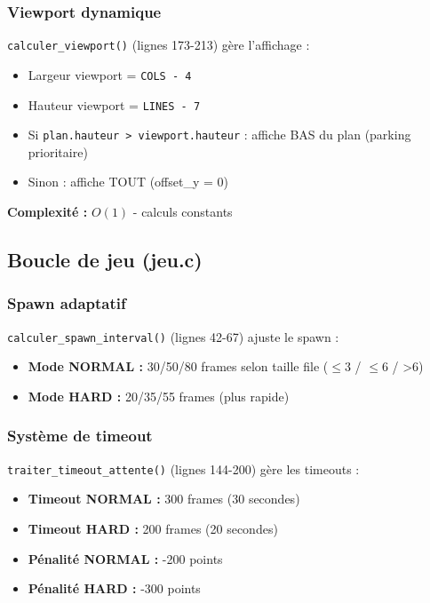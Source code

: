 \documentclass[12pt,a4paper]{article}
\begin{document}
\subsubsection{Viewport dynamique}

\texttt{calculer\_viewport()} (lignes 173-213) gère l'affichage :

\begin{itemize}
    \item Largeur viewport = \texttt{COLS - 4}
    \item Hauteur viewport = \texttt{LINES - 7}
    \item Si \texttt{plan.hauteur > viewport.hauteur} : affiche BAS du plan (parking prioritaire)
    \item Sinon : affiche TOUT (offset\_y = 0)
\end{itemize}

\textbf{Complexité :} $O(1)$ - calculs constants

\subsection{Boucle de jeu (jeu.c)}

\subsubsection{Spawn adaptatif}

\texttt{calculer\_spawn\_interval()} (lignes 42-67) ajuste le spawn :

\begin{itemize}
    \item \textbf{Mode NORMAL :} 30/50/80 frames selon taille file ($\leq$3 / $\leq$6 / >6)
    \item \textbf{Mode HARD :} 20/35/55 frames (plus rapide)
\end{itemize}

\subsubsection{Système de timeout}

\texttt{traiter\_timeout\_attente()} (lignes 144-200) gère les timeouts :

\begin{itemize}
    \item \textbf{Timeout NORMAL :} 300 frames (30 secondes)
    \item \textbf{Timeout HARD :} 200 frames (20 secondes)
    \item \textbf{Pénalité NORMAL :} -200 points
    \item \textbf{Pénalité HARD :} -300 points
\end{itemize}
\end{document}

